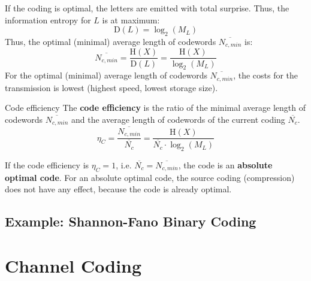 \begin{refsection}
If the coding is optimal, the letters are emitted with total surprise. Thus, the information entropy for $L$ is at maximum:
\begin{equation}
	\mathrm{D}\left(L\right) = \log_2 \left(M_L\right)
\end{equation}
Thus, the optimal (minimal) average length of codewords $\overline{N_{c,min}}$ is:
\begin{equation}
	\overline{N_{c,min}} = \frac{\mathrm{H}\left(X\right)}{\mathrm{D}\left(L\right)} = \frac{\mathrm{H}\left(X\right)}{\log_2 \left(M_L\right)}
\end{equation}
For the optimal (minimal) average length of codewords $\overline{N_{c,min}}$, the costs for the transmission is lowest (highest speed, lowest storage size).

\begin{definition}{Code efficiency}
	The  \textbf{code efficiency} is the ratio of the minimal average length of codewords $\overline{N_{c,min}}$ and the average length of codewords of the current coding $\overline{N_c}$.
	\begin{equation}
		\eta_C = \frac{\overline{N_{c,min}}}{\overline{N_c}} = \frac{\mathrm{H}\left(X\right)}{\overline{N_c} \cdot \log_2 \left(M_L\right)}
	\end{equation}
\end{definition}

If the code efficiency is $\eta_C = 1$, i.e. $\overline{N_c} = \overline{N_{c,min}}$, the code is an  \textbf{absolute optimal code}. For an absolute optimal code, the source coding (compression) does not have any effect, because the code is already optimal.

\subsection{Example: Shannon-Fano Binary Coding}

\section{Channel Coding}

{}
\printbibliography[heading=subbibliography]
\end{refsection}

